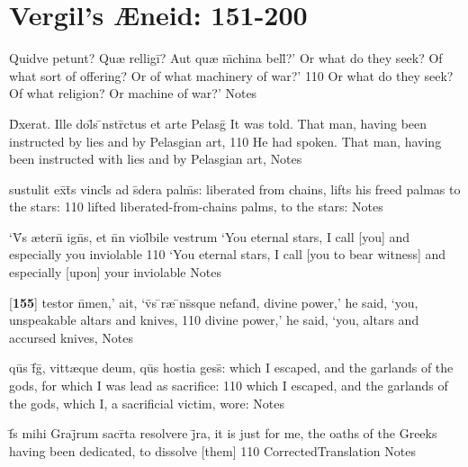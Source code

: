 \section{Vergil's {\AE}neid: 151-200} %

\latline
  {Quidve petunt?  Qu{\ae} relligi\={}?  Aut qu{\ae} m\={}china bell\={\macron {\i}}?'}
  { Or what do they seek?  Of what sort of offering?  Or of what machinery of war?' }
  {110}
  { Or what do they seek?  Of what religion?  Or machine of war?' }
  { Notes }


\latline
  {D\={\macron {\i}}xerat.  Ille dol\={\macron {\i}}s \={\macron {\i}}nstr\={}ctus et arte Pelasg\={}}
  { It was told.  That man, having been instructed by lies and by Pelasgian art,  }
  {110}
  { He had spoken. That man, having been instructed with lies and by Pelasgian art,  }
  { Notes }


\latline
  {sustulit ex\={}t\={}s vincl\={\macron {\i}}s ad s\={\macron {\i}}dera palm\={}s:}
  { liberated from chains, lifts his freed palmas to the stars: }        
  {110}
  { lifted liberated-from-chains palms, to the stars: }
  { Notes }


\latline
  {`V\={}s {\ae}tern\={\macron {\i}} ign\={}s, et n\={}n viol\={}bile vestrum}
  { `You eternal stars, I call [you] and especially you inviolable  }
  {110}
  { `You eternal stars, I call [you to bear witness] and especially [upon] your inviolable  }
  { Notes }


\latline
  {[\textbf{155}] testor n\={}men,' ait, `v\={}s \={}r{\ae} \={}ns\={}sque nefand\={\macron {\i}},}
  { divine power,' he said, `you, unspeakable altars and knives,  }            
  {110}
  { divine power,' he said, `you, altars and accursed knives,  }
  { Notes }


\latline
  {qu\={}s f\={}g\={\macron {\i}}, vitt{\ae}que deum, qu\={}s hostia gess\={\macron {\i}}:}
  { which I escaped, and the garlands of the gods, for which I was lead as sacrifice:  }
  {110}
  { which I escaped, and the garlands of the gods, which I, a sacrificial victim, wore:  }
  { Notes }


\latline
  {f\={}s mihi Graj\={}rum sacr\={}ta resolvere j\={}ra,}
  { it is just for me, the oaths of the Greeks having been dedicated, to dissolve [them] }
  {110}
  { CorrectedTranslation }
  { Notes }


